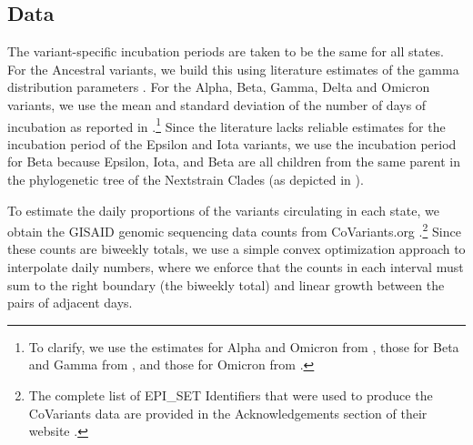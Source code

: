 \documentclass{article}
\begin{document}

\subsection{Data} 


The variant-specific incubation periods are taken to be the same for all states.
For the Ancestral variants, we build this using
literature estimates of the gamma distribution parameters \citep{tindale2020evidence}. 
For the Alpha, Beta, Gamma, Delta and Omicron variants, we use the
mean and standard deviation of the number of days of incubation as reported in
\citet{tanaka2022shorter, grant2022impact, ogata2022shorter}.\footnote{To clarify, 
we use the estimates for Alpha and Omicron from \citet{tanaka2022shorter}, those for
Beta and Gamma from \citet{grant2022impact}, and those for Omicron from
\citet{ogata2022shorter}.} Since the literature lacks reliable estimates for the incubation
period of the Epsilon and Iota variants, we use the
incubation period for Beta because Epsilon, Iota, and Beta are all
children from the same parent in the phylogenetic tree of the Nextstrain Clades
(as depicted in \citealp{hodcroft2021covariants}).

To estimate the daily proportions of the variants circulating in each state, we
obtain the GISAID genomic sequencing data counts from CoVariants.org
\citep{hodcroft2021covariants, elbe2017data}.\footnote{The complete list of
EPI\_SET Identifiers that were used to produce the CoVariants data are provided
in the Acknowledgements section of their website
\citep{hodcroft2021covariants}.} Since these counts are biweekly totals, we use
a simple convex optimization approach to interpolate daily numbers, where we
enforce that the counts in each interval must sum to the right boundary (the
biweekly total) and linear growth between the pairs of adjacent days. 
\end{document}
